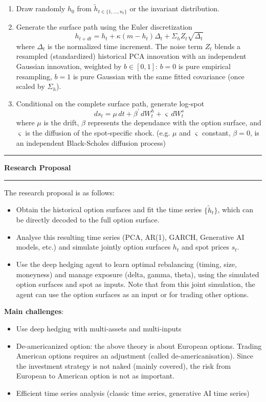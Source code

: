 \documentclass[11pt]{article}
\begin{document}
\begin{enumerate}
    \item Draw randomly $h_0$ from $\tilde h_{t \in \{1,\dots,n_t\}}$ or the invariant distribution.

    \item Generate the surface path using the Euler discretization
    $$
    h_{t+dt} = h_t + \kappa(m - h_t)\Delta_t + \Sigma_h Z_t\sqrt{\Delta_t}
    $$
    where $\Delta_t$ is the normalized time increment. The noise term $Z_t$ blends a resampled (standardized) historical PCA innovation with an independent Gaussian innovation, weighted by $b\in[0,1]$: $b=0$ is pure empirical resampling, $b=1$ is pure Gaussian with the same fitted covariance (once scaled by $\Sigma_h$).

    \item Conditional on the complete surface path, generate log-spot
    $$
    ds_t = \mu \, dt + \beta^{\prime} \, dW_t^h + \varsigma \, dW_t^s
    $$
    where $\mu$ is the drift, $\beta$ represents the dependance with the option surface, and $\varsigma$ is the diffusion of the spot-specific shock. (e.g. $\mu$ and $\varsigma$ constant, $\beta=0$, is an independent Black-Scholes diffusion process)
\end{enumerate}

\vspace{1em}
\hrule
\begin{center}
\textbf{Research Proposal}
\end{center}
\hrule
\vspace{1em}

The research proposal is as follows:
\begin{itemize}
    \item Obtain the historical option surfaces and fit the time series $\{\tilde{h}_t\}$, which can be directly decoded to the full option surface.
    \item Analyse this resulting time series (PCA, AR(1), GARCH, Generative AI models, etc.) and simulate jointly option surfaces $h_t$ and spot prices $s_t$.
    \item Use the deep hedging agent to learn optimal rebalancing (timing, size, moneyness) and manage exposure (delta, gamma, theta), using the simulated option surfaces and spot as inputs. Note that from this joint simulation, the agent can use the option surfaces as an input or for trading other options.
\end{itemize}

\textbf{Main challenges}:
\begin{itemize}
    \item Use deep hedging with multi-assets and multi-inputs
    \item De-americanized option: the above theory is about European options. Trading American options requires an adjustment (called de-americanisation). Since the investment strategy is not naked (mainly covered), the risk from European to American option is not as important.
    \item Efficient time series analysis (classic time series, generative AI time series)
\end{itemize}
\end{document}
